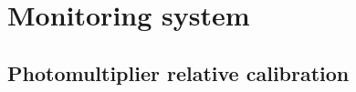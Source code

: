 
\chapter{Monitoring system}

\section{Photomultiplier relative calibration}


\section{}


\section{}



